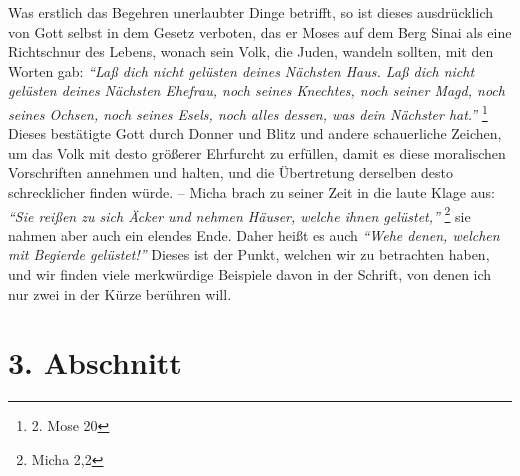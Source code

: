 Was erstlich das Begehren unerlaubter Dinge betrifft, so ist dieses
ausdrücklich von Gott selbst in dem Gesetz verboten,
das er Moses auf dem
Berg Sinai als eine Richtschnur des Lebens, wonach
sein Volk, die Juden,
wandeln sollten, mit den Worten gab:
\textit{"`Laß dich nicht gelüsten deines Nächsten
Haus. Laß dich nicht gelüsten deines Nächsten Ehefrau, noch seines Knechtes,
noch seiner Magd, noch seines Ochsen, noch seines Esels, noch alles dessen, was
dein Nächster hat."'}
\footnote{2. Mose 20}
Dieses bestätigte Gott durch Donner und
Blitz und andere schauerliche Zeichen, um das Volk
mit desto größerer Ehrfurcht
zu erfüllen, damit es diese moralischen Vorschriften annehmen und halten, und
die Übertretung derselben desto schrecklicher finden würde. --
Micha brach zu
seiner Zeit in die laute Klage aus:
\textit{"`Sie reißen zu sich Äcker und nehmen
Häuser, welche ihnen gelüstet,"'}
\footnote{Micha 2,2}
sie nahmen aber auch ein
elendes Ende. Daher heißt es auch
\textit{"`Wehe denen, welchen mit Begierde gelüstet!"'}
Dieses ist der Punkt, welchen wir zu betrachten haben, und wir finden viele
merkwürdige Beispiele davon in der Schrift, von denen ich nur zwei in der Kürze
berühren will.

\section{3. Abschnitt} \label{kap13_ab3}


